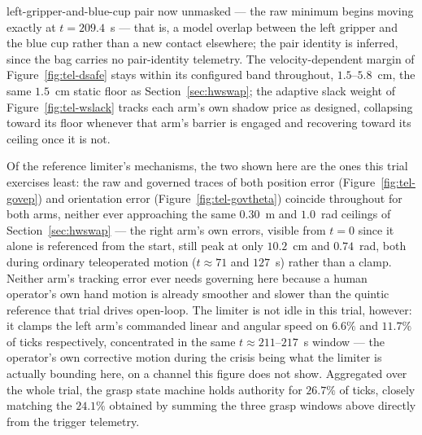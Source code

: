 left-gripper-and-blue-cup pair now unmasked --- the raw minimum begins moving exactly at $t=209.4$~s --- that is, a model overlap between the left gripper and the blue cup rather than a new contact elsewhere; the pair identity is inferred, since the bag carries no pair-identity telemetry. The velocity-dependent margin of Figure~\ref{fig:tel-dsafe} stays within its configured band throughout, $1.5$--$5.8$~cm, the same $1.5$~cm static floor as Section~\ref{sec:hwswap}; the adaptive slack weight of Figure~\ref{fig:tel-wslack} tracks each arm's own shadow price as designed, collapsing toward its floor whenever that arm's barrier is engaged and recovering toward its ceiling once it is not.

Of the reference limiter's mechanisms, the two shown here are the ones this trial exercises least: the raw and governed traces of both position error (Figure~\ref{fig:tel-govep}) and orientation error (Figure~\ref{fig:tel-govtheta}) coincide throughout for both arms, neither ever approaching the same $0.30$~m and $1.0$~rad ceilings of Section~\ref{sec:hwswap} --- the right arm's own errors, visible from $t=0$ since it alone is referenced from the start, still peak at only $10.2$~cm and $0.74$~rad, both during ordinary teleoperated motion ($t\approx71$ and $127$~s) rather than a clamp. Neither arm's tracking error ever needs governing here because a human operator's own hand motion is already smoother and slower than the quintic reference that trial drives open-loop. The limiter is not idle in this trial, however: it clamps the left arm's commanded linear and angular speed on $6.6\%$ and $11.7\%$ of ticks respectively, concentrated in the same $t\approx211$--$217$~s window --- the operator's own corrective motion during the crisis being what the limiter is actually bounding here, on a channel this figure does not show. Aggregated over the whole trial, the grasp state machine holds authority for $26.7\%$ of ticks, closely matching the $24.1\%$ obtained by summing the three grasp windows above directly from the trigger telemetry.

